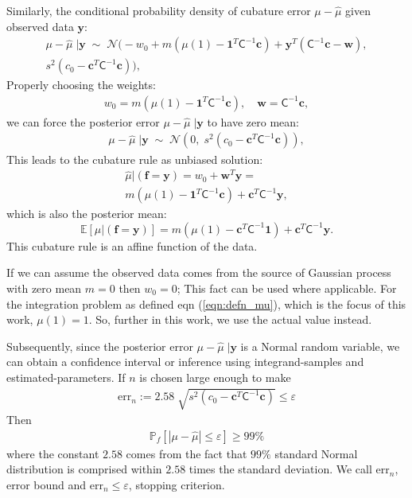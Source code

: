 \documentclass[twocolumn]{svjour3}          %
\newcommand{\bm}[1]{\boldsymbol{#1}}
\newcommand{\Ex}{\mathbb{E}}
\newcommand{\vc}{\bm{c}}
\newcommand{\vf}{\bm{f}}
\newcommand{\vw}{\bm{w}}
\newcommand{\vy}{\bm{y}}
\newcommand{\vone}{\bm{1}}
\newcommand{\mC}{\mathsf{C}}
\newcommand{\calN}{\mathcal{N}}
\newcommand{\hmu}{\widehat{\mu}}
\newcommand{\errtol}{\varepsilon}
\newcommand{\errn}{\text{err}_{n}}
\begin{document}
Similarly, the conditional probability density of cubature error $\mu-\hmu$ given observed data $\vy$:
\begin{multline}
\mu-\hmu\;|\vy
\; \sim \; \calN 
\bigl(
-w_0 + m (\mu(1) - \vone^T  \mC^{-1}\vc )
+
\vy^T( \mC^{-1}\vc - \vw ),
\\
s^2 (c_0 - \vc^T\mC^{-1}\vc) 
\bigr),
\end{multline}
Properly choosing the weights:
\begin{align*}
w_0 =  m (\mu(1) - \vone^T  \mC^{-1}\vc ),
\quad
\vw = \mC^{-1}\vc,
\end{align*}
we can force the posterior error $\mu-\hmu\;|\vy$ to have zero mean:
\begin{align*}
\mu-\hmu\;|\vy
\; \sim \; \calN 
\left(
0, \;
s^2 (c_0 - \vc^T\mC^{-1}\vc) 
\right)
,
\end{align*}
This leads to the cubature rule as unbiased solution:
\begin{multline}
\label{eqn:BayesCub}
\widehat{\mu}  \vert ( \vf = \vy)
= w_0 + \vw^T \vy = 
\\
m(\mu(1) - \vone^T  \mC^{-1}\vc )
+
\vc^T \mC^{-1} \vy,
\end{multline}
which is also the posterior mean: 
\begin{equation} \label{eqn:BayesCub}
\Ex [\mu \vert ( \vf = \vy)] = m(\mu(1) -  \vc^T \mC^{-1}\vone) + \vc^T \mC^{-1}  \vy.
\end{equation}
This cubature rule is an affine function of the data.

If we can assume the observed data comes from the source of Gaussian process with zero mean $m=0$ then $w_0 = 0$; This fact can be used where applicable. For the integration problem as defined eqn (\ref{eqn:defn_mu}), which is the focus of this work, $\mu(1) = 1$. So, further in this work, we use the actual value instead.

Subsequently, since the posterior error $\mu-\hmu\;|\vy$ is a Normal random variable, we can obtain a confidence interval or inference using integrand-samples and estimated-parameters. If $n$ is chosen large enough to make
\begin{align}
\errn := 2.58 \; \sqrt{ s^2 (c_0 - \vc^T\mC^{-1}\vc) } \leq \errtol
\end{align}
Then
\begin{align}
\label{eqn_prob_confidence_interval}
\mathbb{P}_f \left[
|\mu-\hmu| \leq \errtol
\right] \geq 99\%
\end{align}
where the constant $2.58$ comes from the fact that $99\%$ standard Normal distribution is comprised within $2.58$ times the standard deviation. We call $\errn$, error bound and $\errn \leq \errtol$, stopping criterion.
\end{document}
